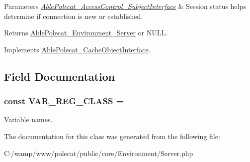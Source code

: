 \begin{DoxyParams}{Parameters}
{\em \hyperlink{interface_able_polecat___access_control___subject_interface}{Able\+Polecat\+\_\+\+Access\+Control\+\_\+\+Subject\+Interface}} & Session status helps determine if connection is new or established.\\
\hline
\end{DoxyParams}
\begin{DoxyReturn}{Returns}
\hyperlink{class_able_polecat___environment___server}{Able\+Polecat\+\_\+\+Environment\+\_\+\+Server} or N\+U\+L\+L. 
\end{DoxyReturn}


Implements \hyperlink{interface_able_polecat___cache_object_interface_a3f2135f6ad45f51d075657f6d20db2cd}{Able\+Polecat\+\_\+\+Cache\+Object\+Interface}.



\subsection{Field Documentation}
\hypertarget{class_able_polecat___environment___server_acb8e57de3e85989a3b4d1fe439cedf3d}{}
\subsubsection[{V\+A\+R\+\_\+\+R\+E\+G\+\_\+\+C\+L\+A\+S\+S}]{\setlength{\rightskip}{0pt plus 5cm}const V\+A\+R\+\_\+\+R\+E\+G\+\_\+\+C\+L\+A\+S\+S = \textquotesingle{}}\label{class_able_polecat___environment___server_acb8e57de3e85989a3b4d1fe439cedf3d}
Variable names. 

The documentation for this class was generated from the following file\+:\begin{DoxyCompactItemize}
\item 
C\+:/wamp/www/polecat/public/core/\+Environment/Server.\+php\end{DoxyCompactItemize}
